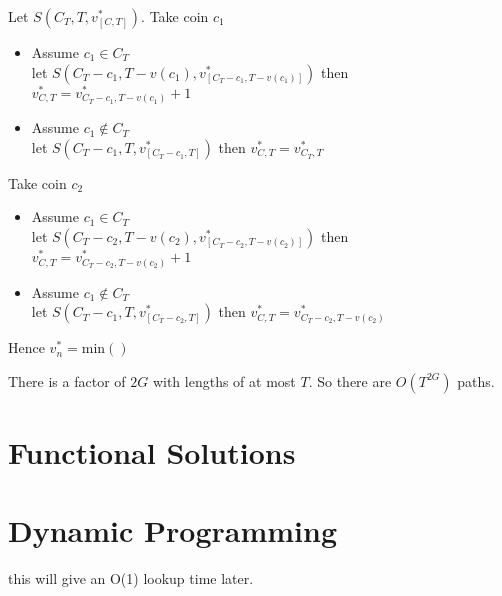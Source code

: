Let $S(C_T, T, v^{*}_{[C,T]})$. 
Take coin $c_1$
\begin{itemize}  
\renewcommand{\labelitemi}{$\Box$}  
\item Assume $c_1 \in C_T$ \\let $S(C_{T}-{c_1}, T-v(c_1), v^{*}_{[C_{T}-{c_1},T-v(c_1)]})$ 
then $v^{*}_{C,T} = v^{*}_{C_{T}-{c_1},T-v(c_1)} + 1$
\item Assume $c_1 \notin C_T$ \\let $S(C_{T}-{c_1}, T, v^{*}_{[C_{T}-{c_1},T]})$ 
then $v^{*}_{C,T} = v^{*}_{C_{T},T}$
\end{itemize} 
Take coin $c_2$
\begin{itemize}  
\renewcommand{\labelitemi}{$\Box$}  
\item Assume $c_1 \in C_T$ \\let $S(C_{T}-{c_2}, T-v(c_2), v^{*}_{[C_{T}-{c_2},T-v(c_2)]})$ 
then $v^{*}_{C,T} = v^{*}_{C_{T}-{c_2},T-v(c_2)} + 1$
\item Assume $c_1 \notin C_T$ \\let $S(C_{T}-{c_1}, T, v^{*}_{[C_{T}-{c_2},T]})$ 
then $v^{*}_{C,T} = v^{*}_{C_{T}-{c_2},T-v(c_2)}$
\end{itemize} 


Hence $v^{*}_n = \text{min}()$


There is a factor of $2G$ with lengths of at most $T$. 
So there are $O(T^{2G})$ paths. 



\section{Functional Solutions}



\section{Dynamic Programming}


 



this will give an O(1) lookup time later. 



